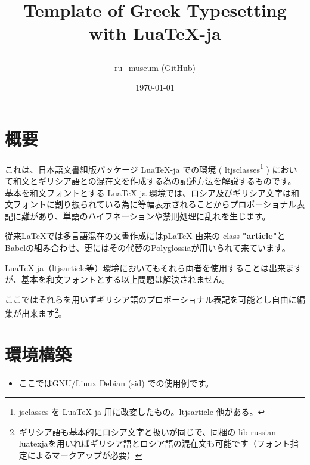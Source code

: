 \documentclass[a4paper,10pt]{ltjsarticle}
\title{
  \huge Template of Greek Typesetting\\ with Lua\TeX{}-ja\vspace{16mm} \par
  \par\vspace{140mm}
}
\author{\href{https://github.com/ru-museum/}{ru\_museum} (GitHub)}
\date{\today}
\def\colH#1{\color[HTML]{#1}}
\begin{document}
\maketitle
\thispagestyle{empty}

\newpage
  
\tableofcontents
\thispagestyle{empty}

\newpage

\section{概要}

これは、日本語文書組版パッケージ {\colH{800000} LuaTeX-ja} での環境 ( {\colH{800000} ltjsclasses}\footnote{jsclasses を LuaTeX-ja 用に改変したもの。ltjsarticle 他がある。} ) において和文とギリシア語との混在文を作成する為の記述方法を解説するものです。\vspace{6pt}\\
基本を和文フォントとする LuaTeX-ja 環境では、ロシア及びギリシア文字は和文フォントに割り振られている為に{\gtfamily 等幅表示}されることから{\gtfamily プロポーショナル表記}に難があり、単語のハイフネーションや禁則処理に乱れを生じます。\vspace{6pt}\par

従来LaTeX{}では多言語混在の文書作成にはp\LaTeX{} 由来の class \textbf{"article"}と{\fRoboto\gtfamily Babel}の組み合わせ、更にはその代替の{\fRoboto\gtfamily Polyglossia}が用いられて来ています。\vspace{6pt}\par

LuaTeX-ja（ltjsarticle等）環境においてもそれら両者を使用することは出来ますが、基本を和文フォントとする以上問題は解決されません。\vspace{6pt}\par

ここではそれらを用いずギリシア語のプロポーショナル表記を可能とし自由に編集が出来ます\footnote{ギリシア語も基本的にロシア文字と扱いが同じで、同梱の{\colH{800000} lib-russian-luatexja}を用いればギリシア語とロシア語の混在文も可能です（フォント指定によるマークアップが必要）}。\vspace{-2mm}

\section{環境構築}
\vspace{-2mm}
\begin{itemize} 
  \item ここではGNU/Linux Debian (sid) での使用例です。\vspace{-4mm}
\end{itemize}
\end{document}
